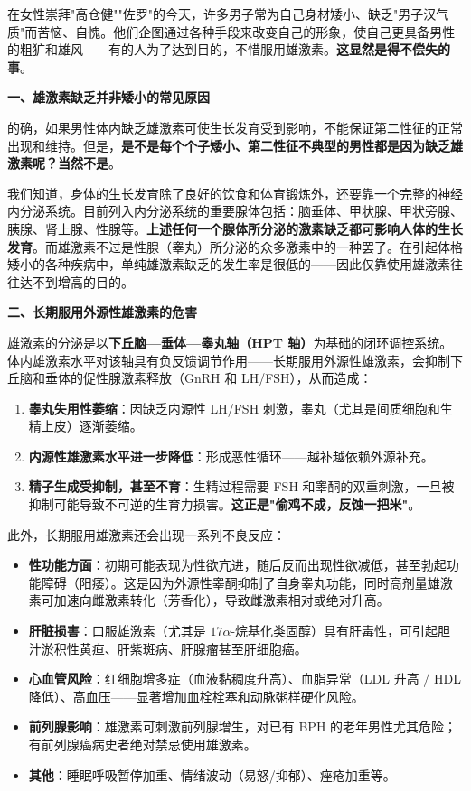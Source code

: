 \begin{enumerate}
在女性崇拜"高仓健""佐罗"的今天，许多男子常为自己身材矮小、缺乏"男子汉气质"而苦恼、自愧。他们企图通过各种手段来改变自己的形象，使自己更具备男性的粗犷和雄风——有的人为了达到目的，不惜服用雄激素。\textbf{这显然是得不偿失的事}。

\vspace{0.5em}
\noindent\textbf{一、雄激素缺乏并非矮小的常见原因}

的确，如果男性体内缺乏雄激素可使生长发育受到影响，不能保证第二性征的正常出现和维持。但是，\textbf{是不是每个个子矮小、第二性征不典型的男性都是因为缺乏雄激素呢？当然不是}。

我们知道，身体的生长发育除了良好的饮食和体育锻炼外，还要靠一个完整的神经内分泌系统。目前列入内分泌系统的重要腺体包括：脑垂体、甲状腺、甲状旁腺、胰腺、肾上腺、性腺等。\textbf{上述任何一个腺体所分泌的激素缺乏都可影响人体的生长发育}。而雄激素不过是性腺（睾丸）所分泌的众多激素中的一种罢了。在引起体格矮小的各种疾病中，单纯雄激素缺乏的发生率是很低的——因此仅靠使用雄激素往往达不到增高的目的。

\vspace{0.5em}
\noindent\textbf{二、长期服用外源性雄激素的危害}

雄激素的分泌是以\textbf{下丘脑—垂体—睾丸轴（HPT 轴）}为基础的闭环调控系统。体内雄激素水平对该轴具有负反馈调节作用——长期服用外源性雄激素，会抑制下丘脑和垂体的促性腺激素释放（GnRH 和 LH/FSH），从而造成：

\begin{enumerate}
	\item \textbf{睾丸失用性萎缩}：因缺乏内源性 LH/FSH 刺激，睾丸（尤其是间质细胞和生精上皮）逐渐萎缩。
	\item \textbf{内源性雄激素水平进一步降低}：形成恶性循环——越补越依赖外源补充。
	\item \textbf{精子生成受抑制，甚至不育}：生精过程需要 FSH 和睾酮的双重刺激，一旦被抑制可能导致不可逆的生育力损害。\textbf{这正是"偷鸡不成，反蚀一把米"}。
\end{enumerate}

此外，长期服用雄激素还会出现一系列不良反应：
\begin{itemize}
	\item \textbf{性功能方面}：初期可能表现为性欲亢进，随后反而出现性欲减低，甚至勃起功能障碍（阳痿）。这是因为外源性睾酮抑制了自身睾丸功能，同时高剂量雄激素可加速向雌激素转化（芳香化），导致雌激素相对或绝对升高。
	\item \textbf{肝脏损害}：口服雄激素（尤其是 $17\alpha$-烷基化类固醇）具有肝毒性，可引起胆汁淤积性黄疸、肝紫斑病、肝腺瘤甚至肝细胞癌。
	\item \textbf{心血管风险}：红细胞增多症（血液黏稠度升高）、血脂异常（LDL 升高 / HDL 降低）、高血压——显著增加血栓栓塞和动脉粥样硬化风险。
	\item \textbf{前列腺影响}：雄激素可刺激前列腺增生，对已有 BPH 的老年男性尤其危险；有前列腺癌病史者绝对禁忌使用雄激素。
	\item \textbf{其他}：睡眠呼吸暂停加重、情绪波动（易怒/抑郁）、痤疮加重等。
\end{itemize}


\end{enumerate}
